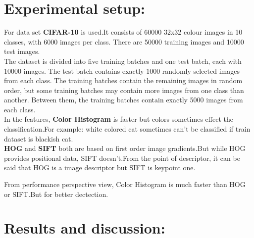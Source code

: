 \documentclass[12pt,a4paper] {article}
\begin{document}
	\section{Experimental setup:}
	For data set \textbf{CIFAR-10} is used.It consists of 60000 32x32 colour images in 10 classes, with 6000 images per class. 
	There are 50000 training images and 10000 test images. \\

	The dataset is divided into five training batches and one test batch, each with 10000 images. The test batch contains exactly 1000 randomly-selected images from each class. The training batches contain the remaining images in random order, but some training batches may contain more images from one class than another. Between them, the training batches contain exactly 5000 images from each class. \\

	In the features, \textbf{Color Histogram} is faster but colors sometimes effect the classification.For example: white colored cat sometimes 
	can't be classified if train dataset is blackish cat. \\

	\textbf{HOG} and \textbf{SIFT} both are based on first order image gradients.But while HOG provides positional data, SIFT doesn't.From the point of
	descriptor, it can be said that HOG is a image descriptor but SIFT is keypoint one. 

	\pagebreak
	From performance perspective view, Color Histogram is much faster than HOG or SIFT.But for better dectection.


	\section{Results and discussion:}
\end{document}
